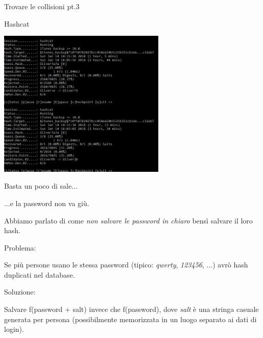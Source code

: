 \documentclass[xcolor=dvipsnames,aspectratio=169]{beamer}
\begin{document}
\begin{frame}{Trovare le collisioni pt.3}

    Hashcat
    
    \medskip
    
    \centering\includegraphics[width=8cm]{img/hashcat}
    
\end{frame}
    
\begin{frame}{Basta un poco di sale...}
  
  ...e la password non va giù.
  
  \medskip

  \pause
  Abbiamo parlato di come \textit{non salvare le password in chiaro} bensì salvare il loro hash.
  
  \medskip
  \pause

  Problema: 
  
  Se più persone usano le stessa password (tipico: \textit{qwerty}, \textit{123456}, ...) avrò hash duplicati nel database.
  
  \medskip
  \pause
  Soluzione: 
  
  Salvare f(password + salt) invece che f(password), dove \textit{salt} è una stringa casuale generata per persona (possibilmente memorizzata in un luogo separato ai dati di login).
  
\end{frame}
\end{document}
